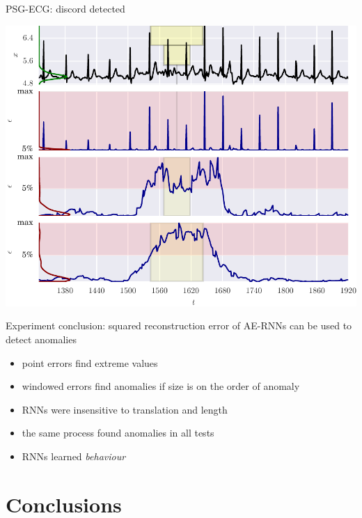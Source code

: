 \documentclass{beamer}
\begin{document}
    \begin{frame}{PSG-ECG: discord detected}

      \includegraphics[width=\textwidth]{figs/er_sleep.pdf}

    \end{frame}



    \begin{frame}{Experiment conclusion: squared reconstruction error of AE-RNNs can be used to detect anomalies}

      \begin{itemize}
        \item point errors find extreme values
        \item windowed errors find anomalies if size is on the order of anomaly
        \item RNNs were insensitive to translation and length
        \item the same process found anomalies in all tests
        \item RNNs learned \emph{behaviour}
      \end{itemize}

    \end{frame}


    \section{Conclusions}
\end{document}
